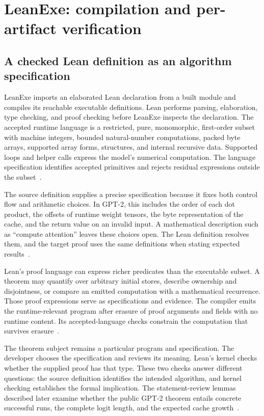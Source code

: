 \section{LeanExe: compilation and per-artifact verification}
\label{sec:leanexe}

\subsection{A checked Lean definition as an algorithm specification}

LeanExe imports an elaborated Lean declaration from a built module and compiles its reachable executable definitions.  Lean performs parsing, elaboration, type checking, and proof checking before LeanExe inspects the declaration.  The accepted runtime language is a restricted, pure, monomorphic, first-order subset with machine integers, bounded natural-number computations, packed byte arrays, supported array forms, structures, and internal recursive data.  Supported loops and helper calls express the model's numerical computation.  The language specification identifies accepted primitives and rejects residual expressions outside the subset~\cite{language,subset}.

The source definition supplies a precise specification because it fixes both control flow and arithmetic choices.  In GPT-2, this includes the order of each dot product, the offsets of runtime weight tensors, the byte representation of the cache, and the return value on an invalid input.  A mathematical description such as ``compute attention'' leaves these choices open.  The Lean definition resolves them, and the target proof uses the same definitions when stating expected results~\cite{cached,kernels,numerics}.

Lean's proof language can express richer predicates than the executable subset.  A theorem may quantify over arbitrary initial stores, describe ownership and disjointness, or compare an emitted computation with a mathematical recurrence.  Those proof expressions serve as specifications and evidence.  The compiler emits the runtime-relevant program after erasure of proof arguments and fields with no runtime content.  Its accepted-language checks constrain the computation that survives erasure~\cite{language}.

The theorem subject remains a particular program and specification.  The developer chooses the specification and reviews its meaning.  Lean's kernel checks whether the supplied proof has that type.  These two checks answer different questions: the source definition identifies the intended algorithm, and kernel checking establishes the formal implication.  The statement-review lemmas described later examine whether the public GPT-2 theorem entails concrete successful runs, the complete logit length, and the expected cache growth~\cite{reviewlemmas}.

